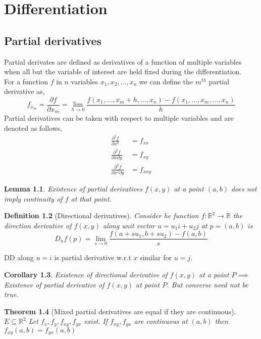 \documentclass[oneside,11pt,pdftex]{book}%
\numberwithin{equation}{section}
\newtheorem{theorem}{Theorem}[chapter]%
\newtheorem{lemma}[theorem]{Lemma}
\newtheorem{corollary}[theorem]{Corollary}
\newtheorem{definition}[theorem]{Definition}
\numberwithin{section}{chapter}
\numberwithin{equation}{chapter}
\newcommand{\R}{\mathbb{R}}
\begin{document}
\chapter{Differentiation}
\section{Partial derivatives}
Partial derivates are defined as derivatives of a function of multiple variables when all but the variable of interest are held fixed during the differentiation.\\
For a function $ f $ in $ n $ variables $ x_1,x_2,\dots, x_n $ we can define the $ m^{th} $ partial derivative as,
\[ f_{x_m}=\frac{\partial f}{\partial x_m} = \lim_{h \rightarrow 0}\frac{f(x_1,\dots, x_m+h,\dots,x_n)-f(x_1,\dots,x_m, \dots,x_n)}{h}\]
Partial derivatives can be taken with respect to multiple variables and are denoted as follows,
\begin{align*}
	\frac{\partial^2 f}{\partial x^2}&=f_{xx}\\
	\frac{\partial^2 f}{\partial x \partial y}&=f_{xy}\\
	\frac{\partial^3 f}{\partial x^2 \partial y}&=f_{xxy}
\end{align*}
\begin{lemma}
	Existence of partial derivatives $ f(x,y) $ at a point $ (a,b) $ does not imply continuity of $ f $ at that point.
\end{lemma}


\begin{definition}[Directional derivatives]
	Consider he function $ f:\R^2 \rightarrow \R $ the direction derivative of $ f(x,y) $ along unit vector $ u=u_1i+u_2j $ at $ p=(a,b) $ is \[ D_uf(p)=\lim_{s\rightarrow0} \frac{f(a+su_1,b+su_2)-f(a,b)}{s} \]
\end{definition}
DD along $ u=i $ is partial derivative w.r.t $ x $ similar for $ u=j $.
\begin{corollary}
	Existence of directional derivative of $ f(x,y) $ at a point $ P \implies $ Existence of partial derivative of $ f(x,y) $ at point $ P $. But converse need not be true.
\end{corollary}

\begin{theorem}[Mixed partial derivatives are equal if they are continuous]
	$ E \subseteq \R^2 $ Let $ f_x, f_y, f_{xy} , f_{yx}$ exist. If $ f_{xy} , f_{yx}$ are continuous at $ (a,b) $ then $ f_{xy}(a,b)=f_{yx} (a,b)$
\end{theorem}
\end{document}
